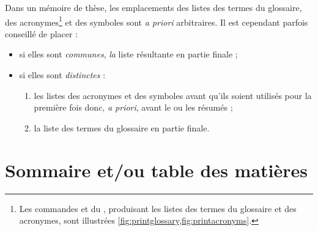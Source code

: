 Dans un mémoire de thèse, les emplacements des listes des termes du glossaire,
des acronymes\footnote{Les commandes  et
   du , produisant les listes
  des termes du glossaire et des acronymes, sont illustrées
  \vref{fig:printglossary,fig:printacronyms}.} et des symboles sont \emph{a
  priori} arbitraires. Il est cependant parfois conseillé de placer :
  \begin{itemize}
  \item si elles sont \emph{communes}, \emph{la} liste résultante en partie finale ;
  \item si elles sont \emph{distinctes} :
    \begin{enumerate}
    \item les listes des acronymes et des symboles avant qu'ils soient utilisés
      pour la première fois donc, \emph{a priori}, avant le ou les résumés ;
    \item la liste des termes du glossaire en partie finale.
    \end{enumerate}
  \end{itemize}

\section{Sommaire et/ou table des matières}\label{sec:table-des-matieres}

